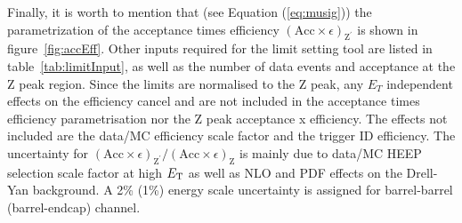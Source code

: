 Finally, it is worth to mention that (see Equation (\ref{eq:musig})) the parametrization of the acceptance times efficiency $(\mathrm{Acc}\times\epsilon)_{\mathrm{Z}^{'}}$ is shown in figure~\ref{fig:accEff}. Other inputs required for the limit setting tool are listed in table~\ref{tab:limitInput}, as well as the number of data events and acceptance at the Z peak region. Since the limits are normalised to the Z peak, any $E_T$ independent effects on the efficiency cancel and are not included in the acceptance times efficiency parametrisation nor the Z peak acceptance x efficiency. The effects not included are the data/MC efficiency scale factor and the trigger ID efficiency.
The uncertainty for $(\mathrm{Acc}\times\epsilon)_{\mathrm{Z}^{'}}/(\mathrm{Acc}\times\epsilon)_{\mathrm{Z}}$ is mainly due to data/MC HEEP selection scale factor at high $E_{\mathrm{T}}$ as well as NLO and PDF effects on the Drell-Yan background. A 2\% (1\%) energy scale uncertainty is assigned for barrel-barrel (barrel-endcap) channel.

